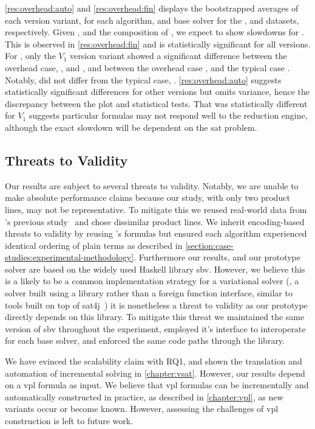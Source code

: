%
\autoref{res:overhead:auto} and \autoref{res:overhead:fin} displays the
bootstrapped averages of each version variant, for each algorithm, and base
solver for the \auto{}, and \fin{} datasets, respectively. Given , and
the composition of \fin{}, we expect \vsat{} to show slowdowns for \fin{}. This
is observed in \autoref{res:overhead:fin} and is statistically significant for
all versions. For \auto{}, only the $V_{1}$ version variant showed a significant
difference between the overhead case, \pTov{}, and \vTov{}, and between the
overhead case \pTov{}, and the typical case \vTop{}. Notably, \vTov{} did not
differ from the typical case, \vTop{}. \autoref{res:overhead:auto} suggests
statistically significant differences for other versions but omits variance,
hence the discrepancy between the plot and statistical tests. That \pTov{} was
statistically different for $V_{1}$ suggests particular formulas may not respond
well to the reduction engine, although the exact slowdown will be dependent on
the \ac{sat} problem.

\subsection{Threats to Validity}
Our results are subject to several threats to validity. Notably, we are unable
to make absolute performance claims because our study, with only two product
lines, may not be representative. To mitigate this we reused real-world data
from \nieke{}'s previous study~\citep{NMS+:GPCE18} and chose dissimilar product
lines. We inherit encoding-based threats to validity by reusing \nieke{}'s
formulas but ensured each algorithm experienced identical ordering of plain
terms as described in \autoref{section:case-studies:experimental-methodology}.
Furthermore our results, and our prototype solver are based on the widely used
Haskell library sbv. However, we believe this is a likely to be a common
implementation strategy for a variational solver (\ie{}, a solver built using a
library rather than a foreign function interface, similar to tools built on top
of sat4j~\citep{LP:JSAT10}) it is nonetheless a threat to validity as our
prototype directly depends on this library. To mitigate this threat we
maintained the same version of sbv throughout the experiment, employed it's
interface to interoperate for each base solver, and enforced the same code paths
through the library.

We have evinced the scalability claim with RQ1, and shown the translation and
automation of incremental solving in \autoref{chapter:vsat}. However, our
results depend on a \ac{vpl} formula as input. We believe that \ac{vpl} formulas
can be incrementally and automatically constructed in practice, as described in
\autoref{chapter:vpl}, as new variants occur or become known. However, assessing
the challenges of \ac{vpl} construction is left to future work.

